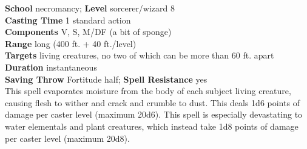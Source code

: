 \textbf{School} necromancy; \textbf{Level} sorcerer/wizard 8\\
\textbf{Casting Time} 1 standard action\\
\textbf{Components} V, S, M/DF (a bit of sponge)\\
\textbf{Range} long (400 ft. + 40 ft./level)\\
\textbf{Targets} living creatures, no two of which can be more than 60 ft. apart\\
\textbf{Duration} instantaneous\\
\textbf{Saving Throw} Fortitude half; \textbf{Spell Resistance} yes\\
This spell evaporates moisture from the body of each subject living creature, causing flesh to wither and crack and crumble to dust. This deals 1d6 points of damage per caster level (maximum 20d6). This spell is especially devastating to water elementals and plant creatures, which instead take 1d8 points of damage per caster level (maximum 20d8).\\
